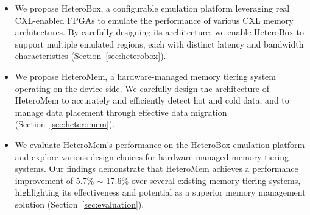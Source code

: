 \begin{itemize}
    
    

    \item We propose HeteroBox, a configurable emulation platform leveraging real CXL-enabled FPGAs to emulate the performance of various CXL memory architectures. By carefully designing its architecture, we enable HeteroBox to support multiple emulated regions, each with distinct latency and bandwidth characteristics (Section~\ref{sec:heterobox}).

    \item We propose HeteroMem, a hardware-managed memory tiering system operating on the device side. We carefully design the architecture of HeteroMem to accurately and efficiently detect hot and cold data, and to manage data placement through effective data migration (Section~\ref{sec:heteromem}).

    \item We evaluate HeteroMem's performance on the HeteroBox emulation platform and explore various design choices for hardware-managed memory tiering systems. Our findings demonstrate that HeteroMem achieves a performance improvement of 5.7\% $\sim$ 17.6\% over several existing memory tiering systems, highlighting its effectiveness and potential as a superior memory management solution (Section~\ref{sec:evaluation}).


\end{itemize}

